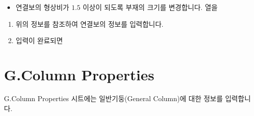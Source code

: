 \documentclass[a4paper,11pt,korean,openany,oneside]{sphinxmanual}
\begin{document}
\begin{itemize}
\begin{description}
\begin{itemize}
\begin{description}
\begin{figure}[htbp]
\noindent{}
\end{figure}
\begin{itemize}
\item {} 
\sphinxAtStartPar
연결보의 형상비가 \(1.5\) 이상이 되도록 부재의 크기를 변경합니다.  열을

\end{itemize}

\end{description}

\end{itemize}

\end{description}

\end{itemize}

\begin{sphinxShadowBox}
\begin{enumerate}
%
\item {} 
\sphinxAtStartPar
위의 정보를 참조하여 연결보의 정보를 입력합니다.

\item {} 
\sphinxAtStartPar
입력이 완료되면 

\end{enumerate}
\end{sphinxShadowBox}

\sphinxstepscope


\section{G.Column Properties}
\label{\detokenize{2_g_column_properties:g-column-properties}}\label{\detokenize{2_g_column_properties::doc}}
\sphinxAtStartPar
G.Column Properties 시트에는 일반기둥(General Column)에 대한 정보를 입력합니다.
\end{document}
